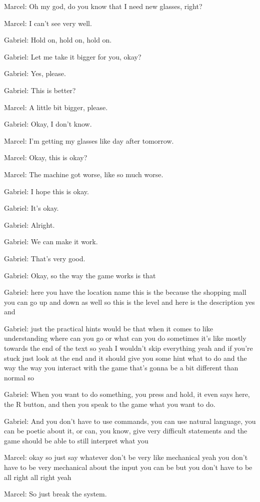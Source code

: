 Marcel: Oh my god, do you know that I need new glasses, right?

Marcel: I can't see very well.

Gabriel: Hold on, hold on, hold on.

Gabriel: Let me take it bigger for you, okay?

Gabriel: Yes, please.

Gabriel: This is better?

Marcel: A little bit bigger, please.

Gabriel: Okay, I don't know.

Marcel: I'm getting my glasses like day after tomorrow.

Marcel: Okay, this is okay?

Marcel: The machine got worse, like so much worse.

Gabriel: I hope this is okay.

Gabriel: It's okay.

Gabriel: Alright.

Gabriel: We can make it work.

Gabriel: That's very good.

Gabriel: Okay, so the way the game works is that

Gabriel: here you have the location name this is the because the shopping mall you can go up and down as well so this is the level and here is the description yes and

Gabriel: just the practical hints would be that when it comes to like understanding where can you go or what can you do sometimes it's like mostly towards the end of the text so yeah I wouldn't skip everything yeah and if you're stuck just look at the end and it should give you some hint what to do and the way the way you interact with the game that's gonna be a bit different than normal so

Gabriel: When you want to do something, you press and hold, it even says here, the R button, and then you speak to the game what you want to do.

Gabriel: And you don't have to use commands, you can use natural language, you can be poetic about it, or can, you know, give very difficult statements and the game should be able to still interpret what you

Marcel: okay so just say whatever don't be very like mechanical yeah you don't have to be very mechanical about the input you can be but you don't have to be all right all right yeah

Marcel: So just break the system.

